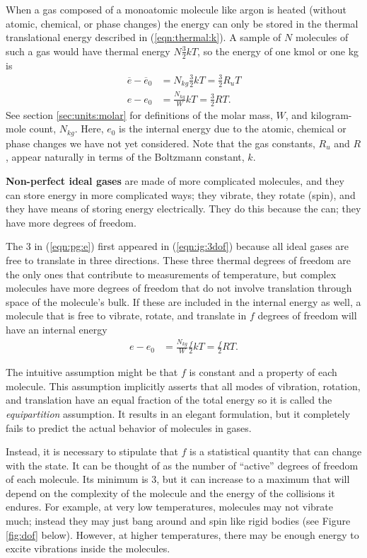 When a gas composed of a monoatomic molecule like argon is heated (without atomic, chemical, or phase changes) the energy can only be stored in the thermal translational energy described in (\ref{eqn:thermal:k}).  A sample of $N$ molecules of such a gas would have thermal energy $N \frac{3}{2} k T$, so the energy of one kmol or one kg is
\begin{align}
\overline{e} - \overline{e}_0 &= N_{kg} \frac{3}{2} k T = \frac{3}{2} R_u T\\
e - e_0 &= \frac{N_{kg}}{W} k T = \frac{3}{2} R T \label{eqn:pg:e}.
\end{align}
See section \ref{sec:units:molar} for definitions of the molar mass, $W$, and kilogram-mole count, $N_{kg}$.  Here, $e_0$ is the internal energy due to the atomic, chemical or phase changes we have not yet considered.  Note that the gas constants, $R_u$ and $R$, appear naturally in terms of the Boltzmann constant, $k$.

{\bf Non-perfect ideal gases} are made of more complicated molecules, and they can store energy in more complicated ways; they vibrate, they rotate (spin), and they have means of storing energy electrically.  They do this because the can; they have more degrees of freedom.

The 3 in (\ref{eqn:pg:e}) first appeared in (\ref{eqn:ig:3dof}) because all ideal gases are free to translate in three directions.  These three thermal degrees of freedom are the only ones that contribute to measurements of temperature, but complex molecules have more degrees of freedom that do not involve translation through space of the molecule's bulk.  If these are included in the internal energy as well, a molecule that is free to vibrate, rotate, and translate in $f$ degrees of freedom will have an internal energy
\begin{align}
e - e_0 &= \frac{N_{kg}}{W} \frac{f}{2} k T = \frac{f}{2} R T.
\end{align}

The intuitive assumption might be that $f$ is constant and a property of each molecule.  This assumption implicitly asserts that all modes of vibration, rotation, and translation have an equal fraction of the total energy so it is called the \emph{equipartition} assumption.  It results in an elegant formulation, but it completely fails to predict the actual behavior of molecules in gases.

Instead, it is necessary to stipulate that $f$ is a statistical quantity that can change with the state.  It can be thought of as the number of ``active'' degrees of freedom of each molecule.  Its minimum is 3, but it can increase to a maximum that will depend on the complexity of the molecule and the energy of the collisions it endures.  For example, at very low temperatures, molecules may not vibrate much; instead they may just bang around and spin like rigid bodies (see Figure \ref{fig:dof} below).  However, at higher temperatures, there may be enough energy to excite vibrations inside the molecules.

